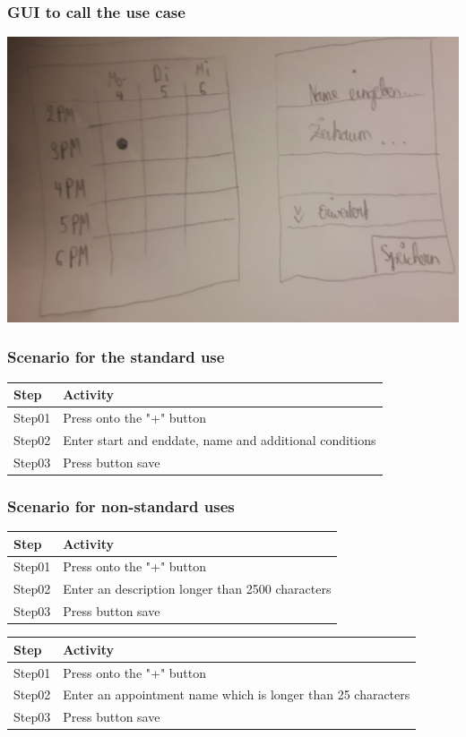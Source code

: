 \documentclass[12pt]{scrartcl}
\begin{document}
    \subsubsection{GUI to call the use case}
        \includegraphics[scale=.4]{Materials/Images/add_appointment.png}
    \subsubsection{Scenario for the standard use}
        \begin{tabular}{|l|l|}
            \hline
            Step & Activity \\ \hline
            Step01 & Press onto the "+" button\\ \hline
            Step02 & Enter start and enddate, name and additional conditions\\ \hline
            Step03 & Press button save\\ \hline
        \end{tabular}
    \subsubsection{Scenario for non-standard uses}
        \begin{tabular}{|l|l|}
            \hline
            Step & Activity \\ \hline
            Step01 & Press onto the "+" button\\ \hline
            Step02 & Enter an description longer than 2500 characters\\ \hline
            Step03 & Press button save\\ \hline
        \end{tabular}
        \vspace*{1 cm}
        \begin{flushleft}
        \begin{tabular}{|l|l|}
            \hline
            Step & Activity \\ \hline
            Step01 & Press onto the "+" button\\ \hline
            Step02 & Enter an appointment name which is longer than 25 characters\\ \hline
            Step03 & Press button save\\ \hline
        \end{tabular}
    \end{flushleft}
\end{document}

